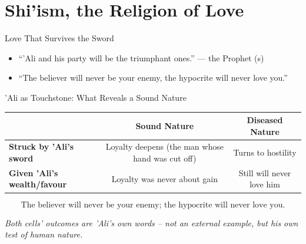 \section{Shi'ism, the Religion of Love}

\begin{frame}{Love That Survives the Sword}

\begin{itemize}[itemsep=4pt]
  \item ``'Ali and his party will be the triumphant ones.'' --- the Prophet (s)
  \item ``The believer will never be your enemy, the hypocrite will never love you.''
\end{itemize}

\end{frame}

\begin{frame}{'Ali as Touchstone: What Reveals a Sound Nature}

\centering
\scriptsize
\renewcommand{\arraystretch}{1.5}

\begin{tabular}{|l|c|c|}
\hline
& \textbf{Sound Nature} & \textbf{Diseased Nature} \\
\hline
\textbf{Struck by 'Ali's sword} &
Loyalty deepens \newline (the man whose hand was cut off) &
Turns to hostility \\
\hline
\textbf{Given 'Ali's wealth/favour} &
Loyalty was never about gain &
Still will never love him \\
\hline
\end{tabular}

\vspace{0.4cm}

\large
\[
\boxed{\text{The believer will never be your enemy; the hypocrite will never love you.}}
\]

\vspace{0.15cm}

\footnotesize
\textit{Both cells' outcomes are 'Ali's own words -- not an external example, but his own test of human nature.}

\end{frame}

